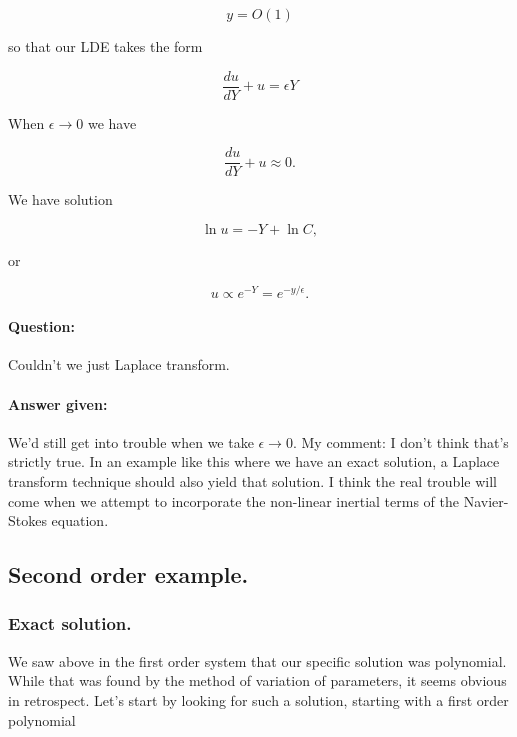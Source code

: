 \begin{equation}\label{eqn:continuumL20:210}
y = O(1)
\end{equation}

so that our LDE takes the form

\begin{equation}\label{eqn:continuumL20:230}
\frac{du}{dY} + u = \epsilon Y
\end{equation}

When $\epsilon \rightarrow 0$ we have

\begin{equation}\label{eqn:continuumL20:250}
\frac{du}{dY} + u \approx 0.
\end{equation}

We have solution

\begin{equation}\label{eqn:continuumL20:270}
\ln u = -Y + \ln C,
\end{equation}

or

\begin{equation}\label{eqn:continuumL20:290}
u \propto e^{-Y} = e^{-y/\epsilon}.
\end{equation}

\paragraph{Question:} Couldn't we just Laplace transform.
\paragraph{Answer given:} We'd still get into trouble when we take $\epsilon \rightarrow 0$.  My comment: I don't think that's strictly true.  In an example like this where we have an exact solution, a Laplace transform technique should also yield that solution.  I think the real trouble will come when we attempt to incorporate the non-linear inertial terms of the Navier-Stokes equation.

\subsection{Second order example.}

\subsubsection{Exact solution.}

We saw above in the first order system that our specific solution was polynomial.  While that was found by the method of variation of parameters, it seems obvious in retrospect.  Let's start by looking for such a solution, starting with a first order polynomial

